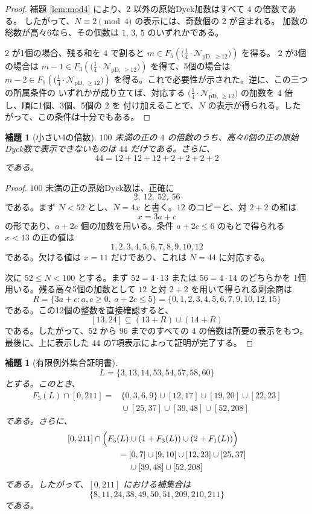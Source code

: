 \documentclass[12pt]{ltjsarticle}
\theoremstyle{plain}
\newtheorem{lemma}[theorem]{補題}
\newcommand{\Pset}{\bigl(\tfrac14\cdot
  \mathcal{N}_{\mathrm{pD},\,\geq12}\bigr)}
\begin{document}
\begin{proof}
補題 \ref{lem:mod4} により、$2$ 以外の原始Dyck加数はすべて $4$ の倍数である。
したがって、$N\equiv2\pmod4$ の表示には、奇数個の $2$ が含まれる。
加数の総数が高々6なら、その個数は $1$, $3$, $5$ のいずれかである。

$2$ が1個の場合、残る和を $4$ で割ると $m\in F_5(\Pset)$ を得る。
$2$ が3個の場合は $m-1\in F_3(\Pset)$ を得て、5個の場合は
$m-2\in F_1(\Pset)$ を得る。これで必要性が示された。逆に、この三つの所属条件の
いずれかが成り立てば、対応する $\Pset$ の加数を $4$ 倍し、順に1個、3個、5個の $2$ を
付け加えることで、$N$ の表示が得られる。したがって、この条件は十分でもある。
\end{proof}

\begin{lemma}[小さい4の倍数]\label{lem:smallmultiples}
$100$ 未満の正の $4$ の倍数のうち、高々6個の正の原始Dyck数で表示できないものは
$44$ だけである。さらに、
\[
 44=12+12+12+2+2+2+2
\]
である。
\end{lemma}

\begin{proof}
$100$ 未満の正の原始Dyck数は、正確に
\[
 2,\ 12,\ 52,\ 56
\]
である。まず $N<52$ とし、$N=4x$ と書く。$12$ のコピーと、対 $2+2$ の和は
\[
 x=3a+c
\]
の形であり、$a+2c$ 個の加数を用いる。条件 $a+2c\leq6$ のもとで得られる
$x<13$ の正の値は
\[
 1,2,3,4,5,6,7,8,9,10,12
\]
である。欠ける値は $x=11$ だけであり、これは $N=44$ に対応する。

次に $52\leq N<100$ とする。まず $52=4\cdot13$ または $56=4\cdot14$ のどちらかを
1個用いる。残る高々5個の加数として $12$ と対 $2+2$ を用いて得られる剰余商は
\[
 R=\{3a+c:a,c\geq0,\ a+2c\leq5\}
   =\{0,1,2,3,4,5,6,7,9,10,12,15\}
\]
である。この12個の整数を直接確認すると、
\[
 [13,24]\subseteq(13+R)\cup(14+R)
\]
である。したがって、$52$ から $96$ までのすべての $4$ の倍数は所要の表示をもつ。
最後に、上に表示した $44$ の7項表示によって証明が完了する。
\end{proof}

\begin{lemma}[有限例外集合証明書]\label{lem:finiteexception}
\[
 L=\{3,13,14,53,54,57,58,60\}
\]
とする。このとき、
\[
\begin{aligned}
F_5(L)\cap[0,211]
={}&\{0,3,6,9\}\cup[12,17]\cup[19,20]\cup[22,23]\\
 &{}\cup[25,37]\cup[39,48]\cup[52,208]
\end{aligned}
\]
である。さらに、
\[
\begin{aligned}
[0,211]\cap\Bigl(F_5(L)&\cup(1+F_3(L))\cup(2+F_1(L))\Bigr)\\
={}&[0,7]\cup[9,10]\cup[12,23]\cup[25,37]\\
 &{}\cup[39,48]\cup[52,208]
\end{aligned}
\]
である。したがって、$[0,211]$ における補集合は
\[
 \{8,11,24,38,49,50,51,209,210,211\}
\]
である。
\end{lemma}
\end{document}
